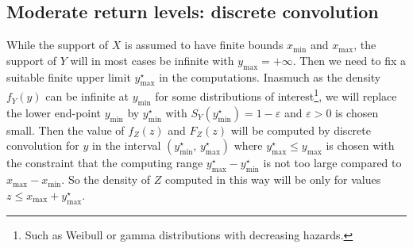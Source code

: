 \documentclass[11pt,a4paper]{report}\usepackage[]{graphicx}\usepackage[]{color}
\newcommand{\m}{\mathbf}
\newcommand{\Low}[1]{#1_{\mathrm{min}}}
\newcommand{\Up}[1]{#1_{\mathrm{max}}}
\begin{document}




\subsection{Moderate return levels: discrete convolution}
\label{CHOOSEGRID}
While the support of $X$ is assumed to have finite bounds $\Low{x}$
and $\Up{x}$, the support of $Y$ will in most cases be infinite with
$\Up{y} = +\infty$. Then we need to fix a suitable finite upper limit
$\Up{y}^\star$ in the computations.  Inasmuch as the density $f_Y(y)$
can be infinite at $\Low{y}$ for some distributions of
interest\footnote{Such as Weibull or gamma distributions with
  decreasing hazards.}, we will replace the lower end-point $\Low{y}$
by $\Low{y^\star}$ with $S_Y(\Low{y^\star}) = 1 - \varepsilon$ and
$\varepsilon>0$ is chosen small.  Then the value of $f_Z(z)$ and
$F_Z(z)$ will be computed by discrete convolution for $y$ in the
interval $(\Low{y^\star}, \,\Up{y^\star})$ where $\Up{y^\star}
\leqslant \Up{y}$ is chosen with the constraint that the computing
range $\Up{y^\star} - \Low{y^\star}$ is not too large compared to
$\Up{x} - \Low{x}$. So the density of $Z$ computed in this way will be
only for values $z \leqslant \Up{x} + \Up{y^\star}$.
\end{document}

